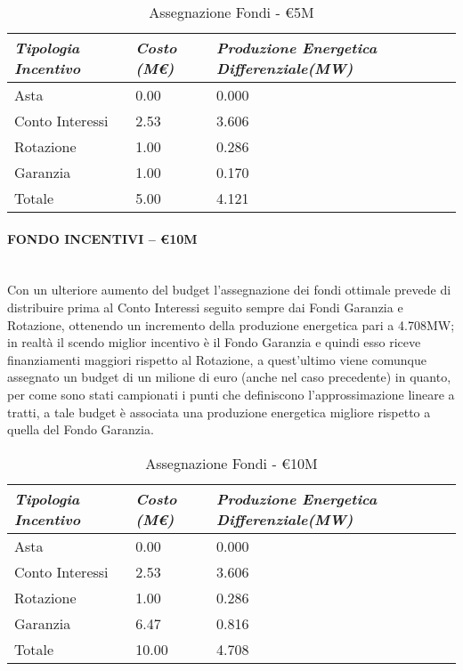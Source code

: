 \documentclass[12pt,a4paper,openright,twoside]{report}
\newcommand{\myparagraph}[1]{\paragraph{#1}\mbox{}\\}
\begin{document}
\begin{table}[h]
\centering
	\begin{tabular}{ p{}  | p{} | p{}  }
		\hline \hline 
		\nohyphens{\emph{Tipologia Incentivo}} & \nohyphens{\emph{Costo (M\euro)}} & \nohyphens{\emph{Produzione Energetica Differenziale(MW)}} \\ \hline
		Asta &  0.00 & 0.000 \\ 
		Conto Interessi & 2.53 & 3.606 \\ 
		Rotazione & 1.00 & 0.286 \\ 
		Garanzia & 1.00 & 0.170 \\ \hline 
		Totale & 5.00 & 4.121 \\
		\hline \hline 
	\end{tabular}
	\caption{Assegnazione Fondi - \euro5M}
	\label{tab:assegnFondi5M}	
\end{table}

\myparagraph{FONDO INCENTIVI – \euro10M}

Con un ulteriore aumento del budget l'assegnazione dei fondi ottimale prevede di distribuire prima al Conto Interessi seguito sempre dai Fondi Garanzia e Rotazione, ottenendo un incremento della produzione energetica pari a 4.708MW; in realtà il scendo miglior incentivo è il Fondo Garanzia e quindi esso riceve finanziamenti maggiori rispetto al Rotazione, a quest'ultimo viene comunque assegnato un budget di un milione di euro (anche nel caso precedente) in quanto, per come sono stati campionati i punti che definiscono l'approssimazione lineare a tratti, a tale budget è associata una produzione energetica migliore rispetto a quella del Fondo Garanzia.

\begin{table}[h]
\centering
	\begin{tabular}{ p{}  | p{} | p{}  }
		\hline \hline 
		\nohyphens{\emph{Tipologia Incentivo}} & \nohyphens{\emph{Costo (M\euro)}} & \nohyphens{\emph{Produzione Energetica Differenziale(MW)}} \\ \hline
		Asta &  0.00 & 0.000 \\ 
		Conto Interessi & 2.53 & 3.606 \\ 
		Rotazione & 1.00 & 0.286 \\ 
		Garanzia & 6.47 & 0.816 \\ \hline 
		Totale & 10.00 & 4.708 \\
		\hline \hline 
	\end{tabular}
	\caption{Assegnazione Fondi - \euro10M}
	\label{tab:assegnFondi10M}	
\end{table}
\end{document}
